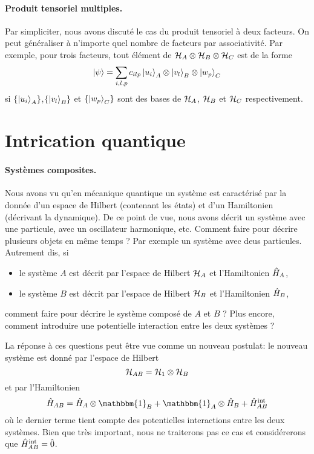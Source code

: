 \documentclass[11pt,a4paper,oneside]{article}
\begin{document}
\paragraph*{Produit tensoriel multiples.} Par simpliciter, nous avons discuté le cas du produit tensoriel à deux facteurs. On peut généraliser à n'importe quel nombre de facteurs par associativité. Par exemple, pour trois facteurs, tout élément de $\mathcal{H}_A\otimes\mathcal{H}_B\otimes\mathcal{H}_C$ est de la forme
\begin{eqnarray}
    \ket{\psi}=\sum_{i,l,p} c_{ilp} \ket{u_i}_A\otimes\ket{v_l}_B\otimes\ket{w_p}_C
\end{eqnarray}
si $\{\ket{u_i}_A\}$,$\{\ket{v_l}_B\}$ et $\{\ket{w_p}_C\}$ sont des bases de $\mathcal{H}_A$, $\mathcal{H}_B$ et $\mathcal{H}_C$ respectivement.

\section{Intrication quantique}

\paragraph*{Systèmes composites.} Nous avons vu qu'en mécanique quantique un système est caractérisé par la donnée d'un espace de Hilbert (contenant les états) et d'un Hamiltonien (décrivant la dynamique). De ce point de vue, nous avons décrit un système avec une particule, avec un oscillateur harmonique, etc. Comment faire pour décrire plusieurs objets en même temps ? Par exemple un système avec deus particules. Autrement dis, si
\begin{itemize}
    \item le système $A$ est décrit par l'espace de Hilbert $\mathcal{H}_A$ et l'Hamiltonien $\hat{H}_A$,
    \item le système $B$ est décrit par l'espace de Hilbert $\mathcal{H}_B$ et l'Hamiltonien $\hat{H}_B$,
\end{itemize}
comment faire pour décrire le système composé de $A$ et $B$ ? Plus encore, comment introduire une potentielle interaction entre les deux systèmes ? 

La réponse à ces questions peut être vue comme un nouveau postulat: le nouveau système est donné par l'espace de Hilbert
\begin{equation}
    \mathcal{H}_{AB} = \mathcal{H}_1\otimes\mathcal{H}_B
\end{equation}
et par l'Hamiltonien
\begin{equation}
    \hH_{AB} = \hH_A\otimes\mathbbm{1}_B+\mathbbm{1}_A\otimes\hH_B+\hH^{\text{int}}_{AB}
\end{equation}
où le dernier terme tient compte des potentielles interactions entre les deux systèmes. Bien que très important, nous ne traiterons pas ce cas et considérerons que $\hat{H}^{\text{int}}_{AB}=\hat{0}$.\\
\end{document}
